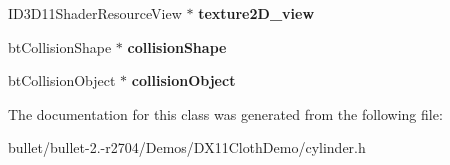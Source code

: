 \begin{DoxyCompactItemize}
\item 
\hypertarget{classcylinder_a8e3ca3c24647b6492584f7ac230a27fa}{I\+D3\+D11\+Shader\+Resource\+View $\ast$ {\bfseries texture2\+D\+\_\+view}}\label{classcylinder_a8e3ca3c24647b6492584f7ac230a27fa}

\item 
\hypertarget{classcylinder_a6a3456a3475277ed4314a4b960b2e1a1}{bt\+Collision\+Shape $\ast$ {\bfseries collision\+Shape}}\label{classcylinder_a6a3456a3475277ed4314a4b960b2e1a1}

\item 
\hypertarget{classcylinder_a677768832cd26d9c1ed9b83403a09106}{bt\+Collision\+Object $\ast$ {\bfseries collision\+Object}}\label{classcylinder_a677768832cd26d9c1ed9b83403a09106}

\end{DoxyCompactItemize}


The documentation for this class was generated from the following file\+:\begin{DoxyCompactItemize}
\item 
bullet/bullet-\/2.-\/r2704/\+Demos/\+D\+X11\+Cloth\+Demo/cylinder.\+h\end{DoxyCompactItemize}
